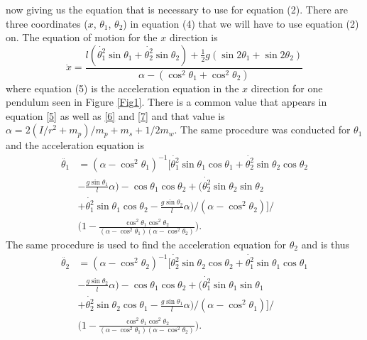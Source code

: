 \documentclass[twocolumn]{article}
\begin{document}
now giving us the equation that is necessary to use for equation (2). There are three coordinates ($x$, $\theta_{1}$, $\theta_{2}$) in equation (4) that we will have to use equation (2) on. The equation of motion for the $x$ direction is
\begin{equation}\label{5}
\ddot{x}=\frac{l(\dot{\theta_{1}^2}\sin{\theta_{1}}+\dot{\theta_{2}^2}\sin{\theta_{2}})+\frac{1}{2}g(\sin{2\theta_{1}}+\sin{2\theta_{2}})}{\alpha-(\cos^2{\theta_{1}}+\cos^2{\theta_{2}})}
\end{equation}
where equation (5) is the acceleration equation in the $x$ direction for one pendulum seen in Figure \ref{Fig1}. There is a common value that appears in equation \ref{5} as well as \ref{6} and \ref{7} and that value is $\alpha=2(I/r^2+m_p)/m_p+m_s+1/2m_w$. The same procedure was conducted for $\theta_{1}$ and the acceleration equation is
\begin{equation}\label{6}
\begin{split}
\ddot{\theta_{1}}&=(\alpha-\cos^2{\theta_1})^{-1}\Bigg[\dot{\theta_{1}^2}\sin{\theta_{1}}\cos{\theta_{1}}+\dot{\theta_{2}^2}\sin{\theta_{2}}\cos{\theta_{2}}\\&
-\frac{g\sin{\theta_{1}}}{l}\alpha)-\cos{\theta_{1}}\cos{\theta_{2}}+\Big(\dot{\theta_{2}^2}\sin{\theta_{2}}\sin{\theta_{2}}\\&
+\dot{\theta_{1}^2}\sin{\theta_{1}}\cos{\theta_{2}}-\frac{g\sin{\theta_{2}}}{l}\alpha\Big)/(\alpha-\cos^2{\theta_2})\Bigg]/ \\&
\Bigg(1-\frac{\cos^2{\theta_{1}}\cos^2{\theta_{2}}}{(\alpha-\cos^2{\theta_1})(\alpha-\cos^2{\theta_2})}\Bigg).
\end{split}
\end{equation}
The same procedure is used to find the acceleration equation for $\theta_{2}$ and is thus
\begin{equation}\label{7}
\begin{split}
\ddot{\theta_{2}}&=(\alpha-\cos^2{\theta_2})^{-1}\Bigg[\dot{\theta_{2}^2}\sin{\theta_{2}}\cos{\theta_{2}}+\dot{\theta_{1}^2}\sin{\theta_{1}}\cos{\theta_{1}}\\&
-\frac{g\sin{\theta_{2}}}{l}\alpha)-\cos{\theta_{1}}\cos{\theta_{2}}+\Big(\dot{\theta_{1}^2}\sin{\theta_{1}}\sin{\theta_{1}}\\&
+\dot{\theta_{2}^2}\sin{\theta_{2}}\cos{\theta_{1}}-\frac{g\sin{\theta_{1}}}{l}\alpha\Big)/(\alpha-\cos^2{\theta_1})\Bigg]/ \\&
\Bigg(1-\frac{\cos^2{\theta_{1}}\cos^2{\theta_{2}}}{(\alpha-\cos^2{\theta_1})(\alpha-\cos^2{\theta_2})}\Bigg).
\end{split}
\end{equation}
\end{document}
